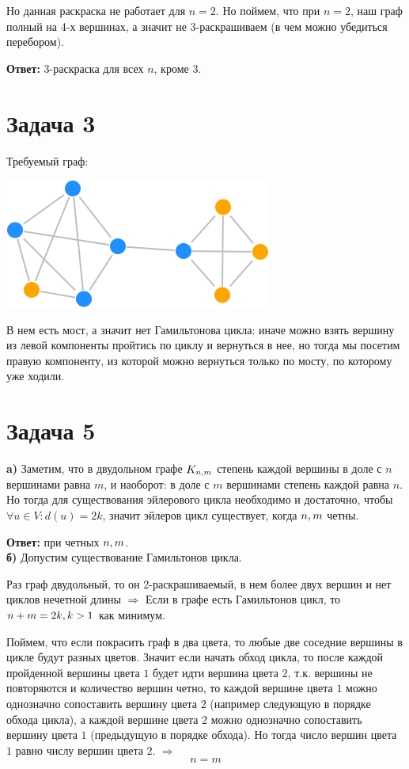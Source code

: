\documentclass{article}
\begin{document}
	Но данная раскраска не работает для $n = 2$. Но поймем, что при $n = 2$, наш граф полный на 4-х вершинах, а значит не 3-раскрашиваем (в чем можно убедиться перебором).
	
	\textbf{Ответ:} 3-раскраска для всех $n$, кроме 3.
\section{Задача 3}

Требуемый граф:
\\
\begin{center}
\includegraphics[scale=0.5]{3_1}
\end{center}

В нем есть мост, а значит нет Гамильтонова цикла: иначе можно взять вершину из левой компоненты пройтись по циклу и вернуться в нее, но тогда мы посетим правую компоненту, из которой можно вернуться только по мосту, по которому уже ходили.


\section{Задача 5}
\textbf{a)} Заметим, что в двудольном графе $K_{n,\space m}$ степень каждой вершины в доле с $n$ вершинами равна $m$, и наоборот: в доле с $m$ вершинами степень каждой равна $n$.
Но тогда для существования эйлерового цикла необходимо и достаточно, чтобы $\forall u \in V: d(u) = 2k$, значит эйлеров цикл существует, когда $n, \space m$ четны.

\textbf{Ответ:} при четных $n,\space m$.
\\
\textbf{б)} Допустим существование Гамильтонов цикла.

Раз граф двудольный, то он 2-раскрашиваемый, в нем более двух вершин и нет циклов нечетной длины $\Rightarrow$ Если в графе есть Гамильтонов цикл, то $n + m = 2k, \space k > 1$ как минимум. 
 
 Поймем, что если покрасить граф в два цвета, то любые две соседние вершины в цикле будут разных цветов. Значит если начать обход цикла, то после каждой пройденной вершины цвета $1$ будет идти вершина цвета $2$, т.к. вершины не повторяются и количество вершин четно, то каждой вершине цвета $1$ можно однозначно сопоставить вершину цвета $2$ (например следующую в порядке обхода цикла), а каждой вершине цвета $2$ можно однозначно сопоставить вершину цвета $1$ (предыдущую в порядке обхода). Но тогда число вершин цвета $1$ равно числу вершин цвета $2$. $\Rightarrow$ $$n = m$$
 
\end{document}
